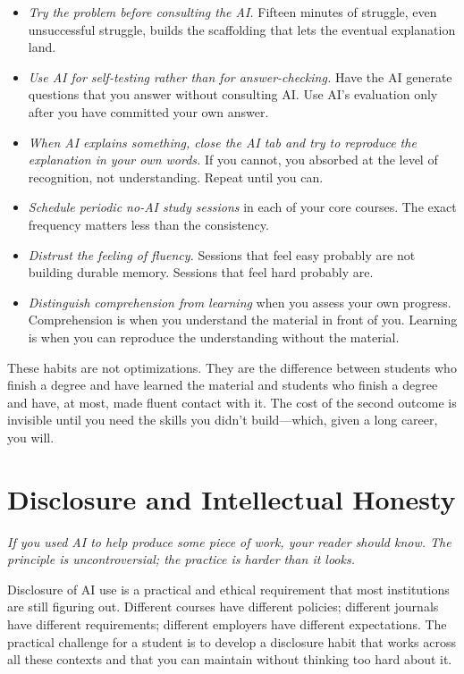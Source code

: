 \documentclass[11pt]{book}
\begin{document}
\begin{itemize}\setlength{\itemsep}{4pt}
\item \emph{Try the problem before consulting the AI.} Fifteen minutes of struggle, even unsuccessful struggle, builds the scaffolding that lets the eventual explanation land.
\item \emph{Use AI for self-testing rather than for answer-checking.} Have the AI generate questions that you answer without consulting AI. Use AI's evaluation only after you have committed your own answer.
\item \emph{When AI explains something, close the AI tab and try to reproduce the explanation in your own words.} If you cannot, you absorbed at the level of recognition, not understanding. Repeat until you can.
\item \emph{Schedule periodic no-AI study sessions} in each of your core courses. The exact frequency matters less than the consistency.
\item \emph{Distrust the feeling of fluency.} Sessions that feel easy probably are not building durable memory. Sessions that feel hard probably are.
\item \emph{Distinguish comprehension from learning} when you assess your own progress. Comprehension is when you understand the material in front of you. Learning is when you can reproduce the understanding without the material.
\end{itemize}

These habits are not optimizations. They are the difference between students who finish a degree and have learned the material and students who finish a degree and have, at most, made fluent contact with it. The cost of the second outcome is invisible until you need the skills you didn't build---which, given a long career, you will.

\chapter{Disclosure and Intellectual Honesty}
\label{ch:disclosure}

\noindent \emph{If you used AI to help produce some piece of work, your reader should know. The principle is uncontroversial; the practice is harder than it looks.}

\medskip

Disclosure of AI use is a practical and ethical requirement that most institutions are still figuring out. Different courses have different policies; different journals have different requirements; different employers have different expectations. The practical challenge for a student is to develop a disclosure habit that works across all these contexts and that you can maintain without thinking too hard about it.
\end{document}
